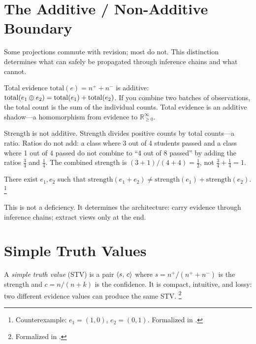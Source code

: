 \documentclass[11pt,openany]{report}
\begin{document}
\section{The Additive / Non-Additive Boundary}

Some projections commute with revision; most do not.  This
distinction determines what can safely be propagated through
inference chains and what cannot.

Total evidence $\mathrm{total}(e) = n^+ + n^-$ is additive:
$\mathrm{total}(e_1 \oplus e_2) = \mathrm{total}(e_1) +
\mathrm{total}(e_2)$.  If you combine two batches of observations,
the total count is the sum of the individual counts.  Total evidence
is an additive shadow---a homomorphism from evidence to
$\mathbb{R}_{\ge 0}^\infty$.

Strength is not additive.  Strength divides positive counts by
total counts---a ratio.  Ratios do not add: a class where 3 out of 4
students passed and a class where 1 out of 4 passed do not combine
to ``4 out of 8 passed'' by adding the ratios $\tfrac{3}{4}$ and
$\tfrac{1}{4}$.  The combined strength is $(3+1)/(4+4) = \tfrac{1}{2}$,
not $\tfrac{3}{4} + \tfrac{1}{4} = 1$.

\begin{theorem}
There exist $e_1, e_2$ such that
$\mathrm{strength}(e_1 + e_2) \ne
\mathrm{strength}(e_1) + \mathrm{strength}(e_2)$.%
\footnote{Counterexample: $e_1 = (1, 0)$, $e_2 = (0, 1)$.
Formalized in .}
\end{theorem}

\noindent
This is not a deficiency.  It determines the architecture: carry
evidence through inference chains; extract views only at the end.


\section{Simple Truth Values}

A \emph{simple truth value} (STV) is a pair $\langle s,\, c \rangle$
where $s = n^+ / (n^+ + n^-)$ is the strength and
$c = n / (n + k)$ is the confidence.  It is compact, intuitive,
and lossy: two different evidence values can produce the same STV.%
\footnote{Formalized in
.}

\end{document}
